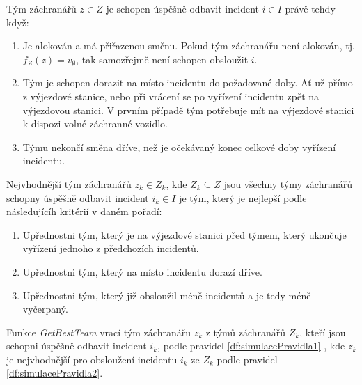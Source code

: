 \begin{definice}\label{df:simulacePravidla1}
  Tým záchranářů $z \in Z$ je schopen úspěšně odbavit incident $i \in I$ právě tehdy když:

  \begin{enumerate}
    \item
      Je alokován a má přiřazenou směnu. Pokud tým záchranářu není alokován, tj. $f_Z(z) = v_{\emptyset}$, tak samozřejmě není schopen obsloužit $i$.

    \item
      Tým je schopen dorazit na místo incidentu do požadované doby.
      Ať už přímo z výjezdové stanice, nebo při vrácení se po vyřízení incidentu zpět na výjezdovou stanici. 
      V prvním případě tým potřebuje mít na výjezdové stanici k dispozi volné záchranné vozidlo.

    \item
      Týmu nekončí směna dříve, než je očekávaný konec celkové doby vyřízení incidentu.
  \end{enumerate}
\end{definice}

\begin{definice}\label{df:simulacePravidla2}
  Nejvhodnější tým záchranářů $z_k \in Z_k$, kde $Z_k \subseteq Z$ jsou všechny týmy záchranářů schopny úspěšně odbavit incident $i_k \in I$ je tým,
  který je nejlepší podle následujícíh kritérií v daném pořadí:

  \begin{enumerate}
    \item Upřednostni tým, který je na výjezdové stanici před týmem, který ukončuje vyřízení jednoho z předchozích incidentů. 
    \item Upřednostni tým, který na místo incidentu dorazí dříve. 
    \item Upřednostni tým, který již obsloužil méně incidentů a je tedy méně vyčerpaný.
  \end{enumerate}
\end{definice}

\begin{definice}[GetBestTeam]\label{df:getBestTeam}
Funkce \textit{GetBestTeam} vrací tým záchranářu $z_k$ z týmů záchranářů $Z_k$, kteří jsou schopni úspěšně odbavit incident $i_k$, podle pravidel \ref{df:simulacePravidla1}
, kde $z_k$ je nejvhodnější pro obsloužení incidentu $i_k$ ze $Z_k$ podle pravidel \ref{df:simulacePravidla2}. 
\end{definice}

